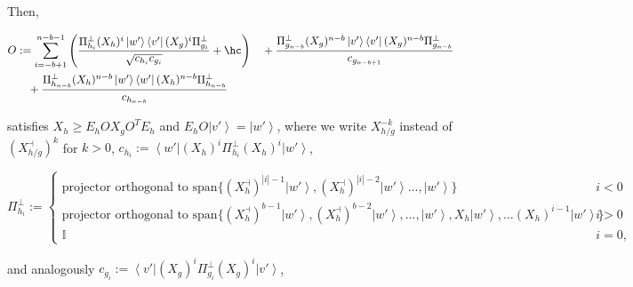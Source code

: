 \documentclass{article}
\begin{document}
\begin{proposition}
\begin{itemize}
  \end{itemize}
  Then,\begin{footnotesize}
    \begin{align*}
      O & :=\sum_{i=-b+1}^{n-b-1}\left(\frac{\Pi_{h_{i}}^{\perp}(X_{h})^{i}\left|w'\right\rangle \left\langle v'\right|(X_{g})^{i}\Pi_{g_{i}}^{\perp}}{\sqrt{c_{h_{i}}c_{g_{i}}}}+\hc\right)
      \quad+\frac{\Pi_{g_{n-b}}^{\perp}(X_{g})^{n-b}\left|v'\right\rangle \left\langle v'\right|(X_{g})^{n-b}\Pi_{g_{n-b}}^{\perp}}{c_{g_{n-b+1}}}                                           \\
        & \quad+\frac{\Pi_{h_{n-b}}^{\perp}(X_{h})^{n-b}\left|w'\right\rangle \left\langle w'\right|(X_{h})^{n-b}\Pi_{h_{n-b}}^{\perp}}{c_{h_{n-b}}}
    \end{align*}
  \end{footnotesize}
  satisfies $X_{h}\ge E_{h}OX_{g}O^{T}E_{h}$ and $E_{h}O\left|v'\right\rangle =\left|w'\right\rangle$,
  where we write $X_{h/g}^{-k}$ instead of $(X_{h/g}^{\dashv})^{k}$
  for $k>0$, $c_{h_{i}}:=\left\langle w'\right|(X_{h})^{i}\Pi_{h_{i}}^{\perp}(X_{h})^{i}\left|w'\right\rangle $,
  \begin{footnotesize}
    \begin{displaymath}
      \Pi_{h_{i}}^{\perp}:=\begin{cases}
        \text{projector orthogonal to }\text{span}\{(X_{h}^{\dashv})^{|i|-1}\left|w'\right\rangle ,(X_{h}^{\dashv})^{|i|-2}\left|w'\right\rangle \dots,\left|w'\right\rangle \}                                                                   & i<0  \\
        \text{projector orthogonal to }\text{span}\{(X_{h}^{\dashv})^{b-1}\left|w'\right\rangle ,(X_{h}^{\dashv})^{b-2}\left|w'\right\rangle ,\dots,\left|w'\right\rangle ,X_{h}\left|w'\right\rangle ,\dots(X_{h})^{i-1}\left|w'\right\rangle \} & i>0  \\
        \mathbb{I}                                                                                                                                                                                                                                & i=0,
      \end{cases}
    \end{displaymath}
  \end{footnotesize}
  and analogously  $c_{g_{i}}:=\left\langle v'\right|(X_{g})^{i}\Pi_{g_{i}}^{\perp}(X_{g})^{i}\left|v'\right\rangle $,
  \begin{footnotesize}
    \begin{displaymath}

\end{displaymath}
\end{footnotesize}
\end{proposition}
\end{document}
